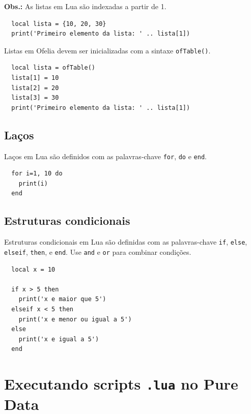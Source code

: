 \documentclass{article}
\begin{document}
\textbf{Obs.:} As listas em Lua são indexadas a partir de 1.

\begin{center}
  \begin{lstlisting}
  local lista = {10, 20, 30}
  print('Primeiro elemento da lista: ' .. lista[1])
  \end{lstlisting}
\end{center}

Listas em Ofelia devem ser inicializadas com a sintaxe \texttt{ofTable()}.

\begin{center}
  \begin{lstlisting}
  local lista = ofTable()
  lista[1] = 10
  lista[2] = 20
  lista[3] = 30
  print('Primeiro elemento da lista: ' .. lista[1])
  \end{lstlisting}
\end{center}

\subsection{Laços}

Laços em Lua são definidos com as palavras-chave \texttt{for}, \texttt{do} e \texttt{end}.

\begin{center}
  \begin{lstlisting}
  for i=1, 10 do
    print(i)
  end
  \end{lstlisting}
\end{center}

\subsection{Estruturas condicionais}

Estruturas condicionais em Lua são definidas com as palavras-chave \texttt{if}, \texttt{else}, \texttt{elseif}, \texttt{then}, e \texttt{end}.
Use \texttt{and} e \texttt{or} para combinar condições.

\begin{center}
  \begin{lstlisting}
  local x = 10

  if x > 5 then
    print('x e maior que 5')
  elseif x < 5 then
    print('x e menor ou igual a 5')
  else
    print('x e igual a 5')
  end
  \end{lstlisting}
\end{center}

\section{Executando scripts \texttt{.lua} no Pure Data}
\end{document}
